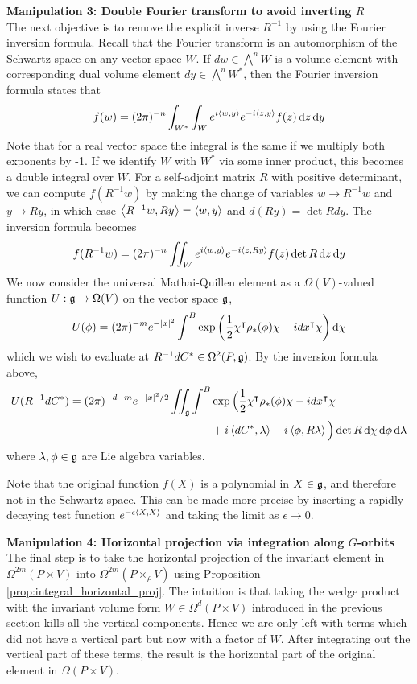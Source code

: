 \vspace{1ex}\noindent
\textbf{Manipulation 3: Double Fourier transform to avoid inverting $R$} \\
The next objective is to remove the explicit inverse $R^{-1}$ by using the
Fourier inversion formula. Recall that the Fourier transform is an automorphism
of the Schwartz space on any vector space $W$. If  $dw\in\bigwedge^n W$ is a
volume element with corresponding dual volume element $dy\in \bigwedge^nW^*$,
then the Fourier inversion formula states that 
\[
	f(w) =
	(2\pi)^{-n}\int_{W^*}\int_{W}e^{i\gen{w,y}}e^{-i\gen{z,y}}f(z)\odif{z}\odif{y}
\] 
Note that for a real vector space the integral is the same if we multiply both
exponents by -1.
If we identify $W$ with  $W^*$ via some inner product, this becomes a double
integral over $W$. For a self-adjoint matrix $R$ with positive determinant, we
can compute  $f(R^{-1}w)$ by making the change of variables $w \to R^{-1}w$ and
$y\to Ry$, in which case $\gen{R^{-1}w,Ry}=\gen{w,y}$ and $d(Ry)=\det R dy$. 
The inversion formula becomes
\[
f(R^{-1}w) = (2\pi)^{-n}\iint_W e^{i\gen{w,y}}e^{-i\gen{z,Ry}}f(z)\det R\odif{z}\odif{y}
\] 
We now consider the universal Mathai-Quillen element as a $\Omega(V)$-valued 
function $U:\operatorname{\mathfrak{g}} \to \Omega(V)$ on the vector space $\operatorname{\mathfrak{g}}$, 
\[
U(\phi) = (2\pi)^{-m}e^{-\abs{x}^2}\int^B
	\exp\paren{\frac{1}{2}\chi^{\intercal}\rho_*(\phi)\chi - idx^\intercal \chi}
	\odif{\chi}
\] 
which we wish to
evaluate at $R^{-1}dC^* \in \Omega^2(P,\operatorname{\mathfrak{g}})$. By the inversion formula above,
\begin{align} \label{eq:fourier_thom}
	U(R^{-1}dC^*) = (2\pi)^{-d-m}e^{-\abs{x}^2 /2}\iint_{\g}\int^B 
	&\exp\Big(\frac{1}{2}\chi^{\intercal}\rho_*(\phi)\chi - idx^\intercal \chi\\
	&+i\gen{dC^*,\lambda}-i\gen{\phi,R\lambda}\Big) \det R
	\odif{\chi} \odif{\phi}\odif{\lambda} \nonumber
\end{align}
where $\lambda, \phi \in \operatorname{\mathfrak{g}}$ are Lie algebra variables. 
\begin{remark} %
	Note that the original function $f(X)$ is a polynomial in $X\in\operatorname{\mathfrak{g}}$, and
	therefore not in the Schwartz space. This can be made more precise by
	inserting a rapidly decaying test function $e^{-\epsilon\gen{X,X}}$ and
	taking the limit as $\epsilon\to 0$.
\end{remark}

\vspace{1ex}\noindent
\textbf{Manipulation 4: Horizontal projection via integration along $G$-orbits} \\
The final step is to take the horizontal projection of the invariant element in
$\Omega^{2m}(P\times V)$ into $\Omega^{2m}(P\times_\rho V)$ using Proposition
\ref{prop:integral_horizontal_proj}. 
The intuition is that taking the wedge product with the invariant 
volume form $W\in\Omega^d(P\times V)$ introduced in the previous section 
kills all the vertical components. Hence we are only left with
terms which did not have a vertical part but now with a factor of 
$W$. After integrating out the vertical part of these terms,  
the result is the horizontal part of the original element in
$\Omega(P\times V)$.

